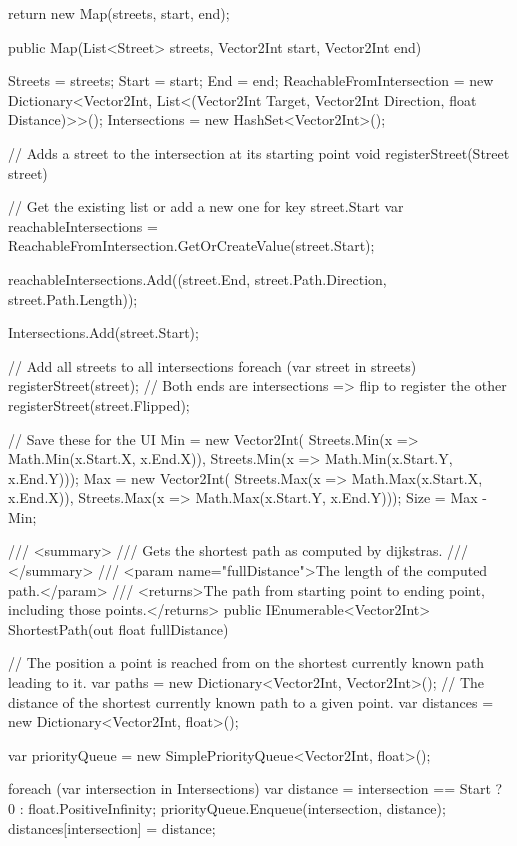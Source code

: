 \documentclass{article}
\theoremstyle{nonumberplain}
\begin{document}
\begin{lstcs}[]
{{        return new Map(streets, start, end);
    }

    public Map(List<Street> streets, Vector2Int start, Vector2Int end)
    {
        Streets = streets;
        Start = start;
        End = end;
        ReachableFromIntersection = new Dictionary<Vector2Int, List<(Vector2Int Target, Vector2Int Direction, float Distance)>>();
        Intersections = new HashSet<Vector2Int>();

        // Adds a street to the intersection at its starting point
        void registerStreet(Street street)
        {
            // Get the existing list or add a new one for key street.Start
            var reachableIntersections = ReachableFromIntersection.GetOrCreateValue(street.Start);

            reachableIntersections.Add((street.End, street.Path.Direction, street.Path.Length));

            Intersections.Add(street.Start);
        }

        // Add all streets to all intersections
        foreach (var street in streets)
        {
            registerStreet(street);
            // Both ends are intersections => flip to register the other
            registerStreet(street.Flipped);
        }

        // Save these for the UI
        Min = new Vector2Int(
            Streets.Min(x => Math.Min(x.Start.X, x.End.X)),
            Streets.Min(x => Math.Min(x.Start.Y, x.End.Y)));
        Max = new Vector2Int(
            Streets.Max(x => Math.Max(x.Start.X, x.End.X)),
            Streets.Max(x => Math.Max(x.Start.Y, x.End.Y)));
        Size = Max - Min;
    }

    /// <summary>
    /// Gets the shortest path as computed by dijkstras.
    /// </summary>
    /// <param name="fullDistance">The length of the computed path.</param>
    /// <returns>The path from starting point to ending point, including those points.</returns>
    public IEnumerable<Vector2Int> ShortestPath(out float fullDistance)
    {
        // The position a point is reached from on the shortest currently known path leading to it.
        var paths = new Dictionary<Vector2Int, Vector2Int>();
        // The distance of the shortest currently known path to a given point.
        var distances = new Dictionary<Vector2Int, float>();

        var priorityQueue = new SimplePriorityQueue<Vector2Int, float>();

        foreach (var intersection in Intersections)
        {
            var distance = intersection == Start ? 0 : float.PositiveInfinity;
            priorityQueue.Enqueue(intersection, distance);
            distances[intersection] = distance;
        }

}}
\end{lstcs}
\end{document}
